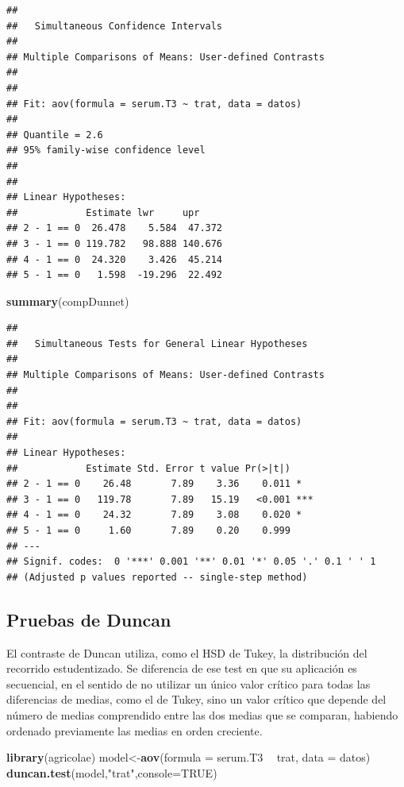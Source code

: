 \documentclass[]{book}
\newenvironment{Shaded}{\begin{snugshade}}{\end{snugshade}}
\newcommand{\KeywordTok}[1]{\textcolor[rgb]{0.13,0.29,0.53}{\textbf{#1}}}
\newcommand{\DataTypeTok}[1]{\textcolor[rgb]{0.13,0.29,0.53}{#1}}
\newcommand{\StringTok}[1]{\textcolor[rgb]{0.31,0.60,0.02}{#1}}
\newcommand{\OtherTok}[1]{\textcolor[rgb]{0.56,0.35,0.01}{#1}}
\newcommand{\OperatorTok}[1]{\textcolor[rgb]{0.81,0.36,0.00}{\textbf{#1}}}
\newcommand{\NormalTok}[1]{#1}
\begin{document}
\begin{verbatim}
## 
##   Simultaneous Confidence Intervals
## 
## Multiple Comparisons of Means: User-defined Contrasts
## 
## 
## Fit: aov(formula = serum.T3 ~ trat, data = datos)
## 
## Quantile = 2.6
## 95% family-wise confidence level
##  
## 
## Linear Hypotheses:
##            Estimate lwr     upr    
## 2 - 1 == 0  26.478    5.584  47.372
## 3 - 1 == 0 119.782   98.888 140.676
## 4 - 1 == 0  24.320    3.426  45.214
## 5 - 1 == 0   1.598  -19.296  22.492
\end{verbatim}

\begin{Shaded}
\begin{Highlighting}[]
\KeywordTok{summary}\NormalTok{(compDunnet)}
\end{Highlighting}
\end{Shaded}

\begin{verbatim}
## 
##   Simultaneous Tests for General Linear Hypotheses
## 
## Multiple Comparisons of Means: User-defined Contrasts
## 
## 
## Fit: aov(formula = serum.T3 ~ trat, data = datos)
## 
## Linear Hypotheses:
##            Estimate Std. Error t value Pr(>|t|)    
## 2 - 1 == 0    26.48       7.89    3.36    0.011 *  
## 3 - 1 == 0   119.78       7.89   15.19   <0.001 ***
## 4 - 1 == 0    24.32       7.89    3.08    0.020 *  
## 5 - 1 == 0     1.60       7.89    0.20    0.999    
## ---
## Signif. codes:  0 '***' 0.001 '**' 0.01 '*' 0.05 '.' 0.1 ' ' 1
## (Adjusted p values reported -- single-step method)
\end{verbatim}

\subsection{Pruebas de Duncan}\label{pruebas-de-duncan}

El contraste de Duncan utiliza, como el HSD de Tukey, la distribución
del recorrido estudentizado. Se diferencia de ese test en que su
aplicación es secuencial, en el sentido de no utilizar un único valor
crítico para todas las diferencias de medias, como el de Tukey, sino un
valor crítico que depende del número de medias comprendido entre las dos
medias que se comparan, habiendo ordenado previamente las medias en
orden creciente.

\begin{Shaded}
\begin{Highlighting}[]
\KeywordTok{library}\NormalTok{(agricolae)}
\NormalTok{model<-}\KeywordTok{aov}\NormalTok{(}\DataTypeTok{formula =}\NormalTok{ serum.T3 }\OperatorTok{~}\StringTok{ }\NormalTok{trat, }\DataTypeTok{data =}\NormalTok{ datos)}
\KeywordTok{duncan.test}\NormalTok{(model,}\StringTok{"trat"}\NormalTok{,}\DataTypeTok{console=}\OtherTok{TRUE}\NormalTok{)}
\end{Highlighting}
\end{Shaded}
\end{document}
